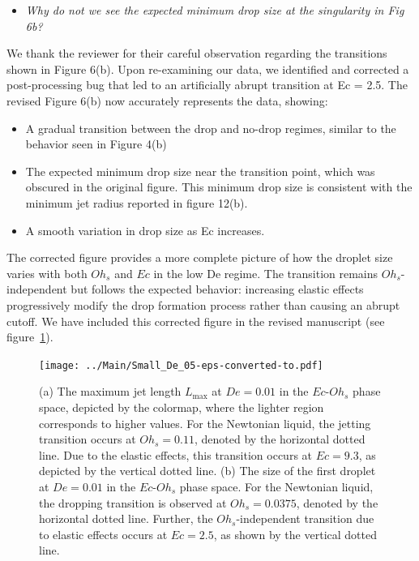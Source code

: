 \documentclass[]{article}
\begin{document}
\begin{enumerate}
\begin{itemize}
		\item \textit{Why do not we see the expected minimum drop size at the singularity in Fig 6b?}

	\end{itemize}

   We thank the reviewer for their careful observation regarding the transitions shown in Figure 6(b). Upon re-examining our data, we identified and corrected a post-processing bug that led to an artificially abrupt transition at Ec = 2.5. The revised Figure 6(b) now accurately represents the data, showing:

   \begin{itemize}
   	\item A gradual transition between the drop and no-drop regimes, similar to the behavior seen in Figure 4(b)
   	\item The expected minimum drop size near the transition point, which was obscured in the original figure. This minimum drop size is consistent with the minimum jet radius reported in figure 12(b).
   	\item A smooth variation in drop size as Ec increases.
   \end{itemize}

   The corrected figure provides a more complete picture of how the droplet size varies with both $Oh_s$ and $Ec$ in the low De regime. The transition remains $Oh_s$-independent but follows the expected behavior: increasing elastic effects progressively modify the drop formation process rather than causing an abrupt cutoff. We have included this corrected figure in the revised manuscript (see figure~\ref{smallDe}).

    \begin{figure}
   	\centering
   	\texttt{[image: ../Main/Small\_De\_05-eps-converted-to.pdf]}
   	\caption{(a) The maximum jet length $L_{\text{max}}$ at $De = 0.01$ in the $Ec$-$Oh_s$ phase space, depicted by the colormap, where the lighter region corresponds to higher values. For the Newtonian liquid, the jetting transition occurs at $Oh_s = 0.11$, denoted by the horizontal dotted line. Due to the elastic effects, this transition occurs at $Ec = 9.3$, as depicted by the vertical dotted line. (b) The size of the first droplet at $De = 0.01$ in the $Ec$-$Oh_s$ phase space. For the Newtonian liquid, the dropping transition is observed at $Oh_s = 0.0375$, denoted by the horizontal dotted line. Further, the $Oh_s$-independent transition due to elastic effects occurs at $Ec= 2.5$, as shown by the vertical dotted line.}
   	\label{smallDe}
   \end{figure}


\end{enumerate}
\end{document}
